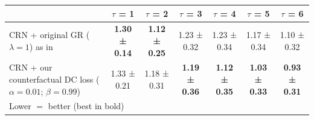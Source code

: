 \begin{tabular}{l|c|ccccc}
\toprule
{} &            $\tau$ = 1 &            $\tau$ = 2 &            $\tau$ = 3 &            $\tau$ = 4 &            $\tau$ = 5 &            $\tau$ = 6 \\
\midrule
CRN + original GR ($\lambda = 1$) as in \cite{bica2020estimating}        &  \textbf{1.30 ± 0.14} &  \textbf{1.12 ± 0.25} &           1.23 ± 0.32 &           1.23 ± 0.34 &           1.17 ± 0.34 &           1.10 ± 0.32 \\
CRN + our counterfactual DC loss ($\alpha = 0.01$; $\beta = 0.99$) &           1.33 ± 0.21 &           1.18 ± 0.31 &  \textbf{1.19 ± 0.36} &  \textbf{1.12 ± 0.35} &  \textbf{1.03 ± 0.33} &  \textbf{0.93 ± 0.31} \\
\bottomrule
\multicolumn{7}{l}{Lower $=$ better (best in bold) }
\end{tabular}
